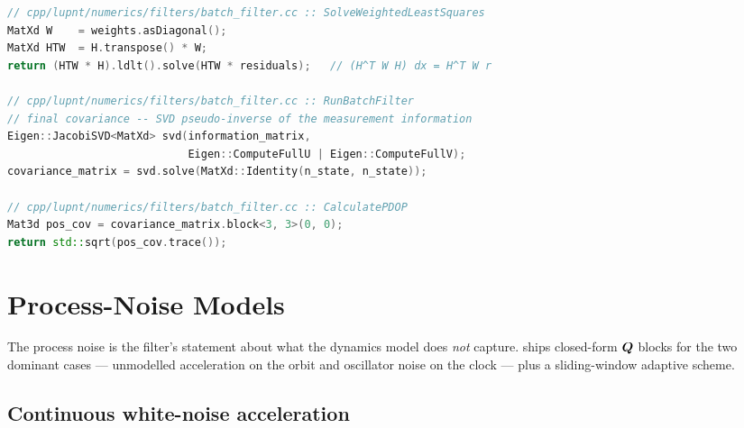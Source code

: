 \begin{lstlisting}[language=cpp, caption={Batch normal-equation solve and covariance.},
                   label={lst:flt-batch}]
// cpp/lupnt/numerics/filters/batch_filter.cc :: SolveWeightedLeastSquares
MatXd W    = weights.asDiagonal();
MatXd HTW  = H.transpose() * W;
return (HTW * H).ldlt().solve(HTW * residuals);   // (H^T W H) dx = H^T W r

// cpp/lupnt/numerics/filters/batch_filter.cc :: RunBatchFilter
// final covariance -- SVD pseudo-inverse of the measurement information
Eigen::JacobiSVD<MatXd> svd(information_matrix,
                            Eigen::ComputeFullU | Eigen::ComputeFullV);
covariance_matrix = svd.solve(MatXd::Identity(n_state, n_state));

// cpp/lupnt/numerics/filters/batch_filter.cc :: CalculatePDOP
Mat3d pos_cov = covariance_matrix.block<3, 3>(0, 0);
return std::sqrt(pos_cov.trace());
\end{lstlisting}

\section{Process-Noise Models}
\label{sec:flt-noise}

The process noise is the filter's statement about what the dynamics model does
\emph{not} capture. \lupnt{} ships closed-form $\bm{Q}$ blocks for the two
dominant cases --- unmodelled acceleration on the orbit and oscillator noise on
the clock --- plus a sliding-window adaptive scheme.

\subsection{Continuous white-noise acceleration}
\label{sec:flt-cwna}

